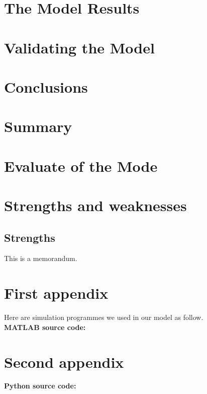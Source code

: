 \documentclass{mcmthesis}  %
\begin{document}
	\section{The Model Results}  %
	
	\section{Validating the Model}  %
	
	\section{Conclusions}  %
	
	\section{Summary}  %
	
	\section{Evaluate of the Mode}  %
	
	\section{Strengths and weaknesses}  %
	
	\subsection{Strengths}  %
	
	\printbibliography  %
	
	
	\begin{appendices}  %
		
		\begin{memo}[Memorandum]  %
			This is a memorandum.
		\end{memo}  %
		
		\section{First appendix}  %
		
		Here are simulation programmes we used in our model as follow.\\
		\textbf{MATLAB source code:}
		
		
		\section{Second appendix}  %
		
		\textbf{Python source code:}
		
		
	\end{appendices}  %
\end{document}
